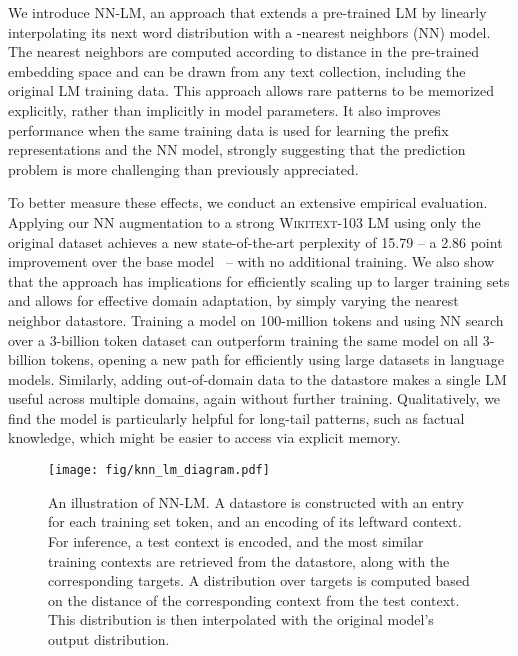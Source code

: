 \documentclass{article} \usepackage{iclr2020_conference,times}
\begin{document}
We introduce NN-LM, an approach that extends a pre-trained LM by linearly interpolating its next word distribution with a -nearest neighbors (NN) model. The nearest neighbors are computed according to distance in the pre-trained embedding space and can be drawn from any text collection,  including the original LM training data.
This approach allows rare patterns to be memorized explicitly, rather than implicitly in model parameters.  It also improves performance when the same training data is used for learning the prefix representations and the NN model, strongly suggesting that the prediction problem is more challenging than previously appreciated.

To better measure these effects, we conduct an extensive empirical evaluation. Applying our NN augmentation to a strong  \textsc{Wikitext-103} LM using only the original dataset achieves a new state-of-the-art perplexity of 15.79 -- a 2.86 point improvement over the base model~\citep{baevski2019adaptive} -- with no additional training.
We also show that the approach has implications for efficiently scaling up to larger training sets and allows for effective domain adaptation, by simply varying the nearest neighbor datastore. 
Training a model on 100-million tokens and using NN search over a 3-billion token dataset can outperform training the same model on all 3-billion tokens, opening a new path for efficiently using large datasets in language models.
Similarly, adding out-of-domain data to the datastore makes a single LM useful across multiple domains, again without further training.
Qualitatively, we find the model is particularly helpful for long-tail patterns, such as factual knowledge, 
which might be easier to access via explicit memory.
 

\begin{figure*}
    \centering
	\texttt{[image: fig/knn\_lm\_diagram.pdf]}
    \caption{An illustration of NN-LM. A datastore is constructed with an entry for each training set token, and an encoding of its leftward context. For inference, a test context is encoded, and the  most similar training contexts are retrieved from the datastore, along with the corresponding targets. A distribution over targets is computed based on the distance of the corresponding context from the test context. This distribution is then interpolated with the original model's output distribution.}
    \label{fig:illustration}
\end{figure*}
\end{document}
